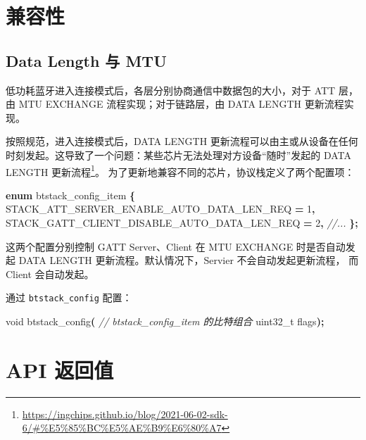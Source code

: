 \documentclass[
  12pt,
]{book}
\newenvironment{Shaded}{\begin{snugshade}}{\end{snugshade}}
\newcommand{\CommentTok}[1]{\textcolor[rgb]{0.56,0.35,0.01}{\textit{#1}}}
\newcommand{\DataTypeTok}[1]{\textcolor[rgb]{0.13,0.29,0.53}{#1}}
\newcommand{\DecValTok}[1]{\textcolor[rgb]{0.00,0.00,0.81}{#1}}
\newcommand{\KeywordTok}[1]{\textcolor[rgb]{0.13,0.29,0.53}{\textbf{#1}}}
\newcommand{\NormalTok}[1]{#1}
\newcommand{\OperatorTok}[1]{\textcolor[rgb]{0.81,0.36,0.00}{\textbf{#1}}}
\begin{document}
\hypertarget{ux517cux5bb9ux6027}{%
\section{兼容性}\label{ux517cux5bb9ux6027}}

\hypertarget{data-length-ux4e0e-mtu}{%
\subsection{Data Length 与 MTU}\label{data-length-ux4e0e-mtu}}

低功耗蓝牙进入连接模式后，各层分别协商通信中数据包的大小，对于 ATT 层，由 MTU EXCHANGE 流程实现；对于链路层，由 DATA LENGTH 更新流程实现。

按照规范，进入连接模式后，DATA LENGTH 更新流程可以由主或从设备在任何时刻发起。这导致了一个问题：某些芯片无法处理对方设备``随时''发起的
DATA LENGTH 更新流程\footnote{\url{https://ingchips.github.io/blog/2021-06-02-sdk-6/\#\%E5\%85\%BC\%E5\%AE\%B9\%E6\%80\%A7}}。
为了更新地兼容不同的芯片，协议栈定义了两个配置项：

\begin{Shaded}
\begin{Highlighting}[]
\KeywordTok{enum}\NormalTok{ btstack\_config\_item }\OperatorTok{\{}
\NormalTok{    STACK\_ATT\_SERVER\_ENABLE\_AUTO\_DATA\_LEN\_REQ }\OperatorTok{=} \DecValTok{1}\OperatorTok{,}
\NormalTok{    STACK\_GATT\_CLIENT\_DISABLE\_AUTO\_DATA\_LEN\_REQ }\OperatorTok{=} \DecValTok{2}\OperatorTok{,}
    \CommentTok{//...}
\OperatorTok{\};}
\end{Highlighting}
\end{Shaded}

这两个配置分别控制 GATT Server、Client 在 MTU EXCHANGE 时是否自动发起 DATA LENGTH 更新流程。默认情况下，Servier 不会自动发起更新流程，
而 Client 会自动发起。

通过 \texttt{btstack\_config} 配置：

\begin{Shaded}
\begin{Highlighting}[]
\DataTypeTok{void}\NormalTok{ btstack\_config}\OperatorTok{(}
  \CommentTok{// btstack\_config\_item 的比特组合}
  \DataTypeTok{uint32\_t}\NormalTok{ flags}\OperatorTok{);}
\end{Highlighting}
\end{Shaded}

\hypertarget{api-ux8fd4ux56deux503c}{%
\section{API 返回值}\label{api-ux8fd4ux56deux503c}}
\end{document}
